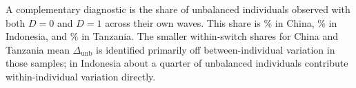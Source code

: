 \documentclass[12pt]{article}
\begin{document}
A complementary diagnostic is the share of unbalanced individuals observed with both $D=0$ and $D=1$ across their own waves.
This share is \unbShareCHN\% in China, \unbShareIDN\% in Indonesia, and \unbShareTZA\% in Tanzania.
The smaller within-switch shares for China and Tanzania mean $\Delta_{\mathrm{unb}}$ is identified primarily off between-individual variation in those samples; in Indonesia about a quarter of unbalanced individuals contribute within-individual variation directly.
\end{document}
